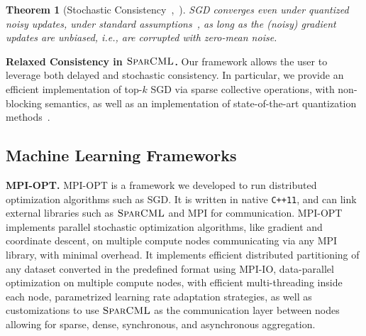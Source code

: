 \documentclass[11pt]{article}
\renewcommand{\paragraph}[1]{\vspace{0.1em} \noindent \textbf{#1}}
\newtheorem{theorem}{Theorem}[section]
\newcommand{\mml}{$\textsc{SparCML}$}
\begin{document}
\begin{theorem}[Stochastic Consistency~\cite{de2015taming},~\cite{alistarh2016qsgd}]
	SGD converges even under quantized noisy updates, under standard
	assumptions~\cite{de2015taming, alistarh2016qsgd}, as long as the
	(noisy) gradient updates are \emph{unbiased}, i.e., are corrupted with zero-mean noise.
\end{theorem}

\paragraph{Relaxed Consistency in \mml{}.} Our framework allows the user
to leverage both delayed and stochastic consistency. In particular, we
provide an efficient implementation of top-$k$ SGD via sparse
collective operations,  with non-blocking semantics, as well as an
implementation of state-of-the-art quantization
methods~\cite{alistarh2016qsgd}. 

\subsection{Machine Learning Frameworks}

\paragraph{MPI-OPT.} MPI-OPT is a framework we developed to run 
distributed optimization algorithms such as SGD. It is written in native \verb!C++11!, and can link external libraries such as \mml{} and MPI for communication. 
MPI-OPT implements parallel stochastic optimization algorithms, like gradient and coordinate
descent, on multiple compute nodes communicating via any MPI library,
with minimal overhead. It implements efficient distributed partitioning of any dataset converted in the predefined format using MPI-IO, 
data-parallel optimization on multiple compute nodes, with efficient multi-threading inside each node, parametrized learning rate adaptation strategies, 
as well as customizations to use \mml{} as the communication layer between nodes allowing for sparse, dense, synchronous, and asynchronous aggregation.
\end{document}
